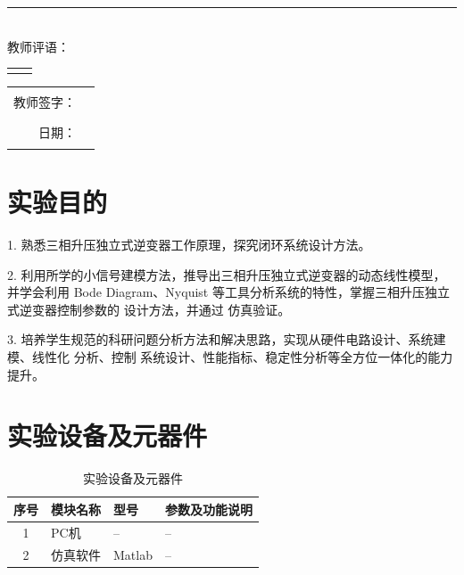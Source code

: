 \documentclass[11pt,a4paper]{article}
\newcommand{\heiSan}{\heiti\fontsize{16pt}{20pt}\selectfont} %
\begin{document}
{\color{blue}\rule{\textwidth}{3pt}}\\[6pt]

{\heiSan 教师评语：}\\[6pt]

\noindent
\begin{tabular}{@{} p{} p{} @{} }
  \vspace{0pt}\\
\end{tabular}

\vspace{8.0cm}

\noindent\hfill
\begin{tabular}{@{} r @{} p{6cm} @{}}
  \heiSan 教师签字： & \rule{6cm}{0.4pt} \\
  \heiSan 日期： & \rule{6cm}{0.4pt} \\
\end{tabular}

\section{实验目的}
1. 熟悉三相升压独立式逆变器工作原理，探究闭环系统设计方法。

2. 利用所学的小信号建模方法，推导出三相升压独立式逆变器的动态线性模型，并学会利用 Bode
Diagram、Nyquist 等工具分析系统的特性，掌握三相升压独立式逆变器控制参数的 设计方法，并通过
仿真验证。

3. 培养学生规范的科研问题分析方法和解决思路，实现从硬件电路设计、系统建模、线性化 分析、控制
系统设计、性能指标、稳定性分析等全方位一体化的能力提升。

\section{实验设备及元器件}

\begin{table}[htbp]
\centering
\caption{实验设备及元器件}
\begin{tabularx}{\textwidth}{|c|>{\centering\arraybackslash}X|>{\centering\arraybackslash}X|>{\centering\arraybackslash}X|}
\hline
\textbf{序号} & \textbf{模块名称} & \textbf{型号} & \textbf{参数及功能说明} \\
\hline
1 & PC机 & -- & -- \\
\hline
2 & 仿真软件 & Matlab & -- \\
\hline
\end{tabularx}
\end{table}
\end{document}
